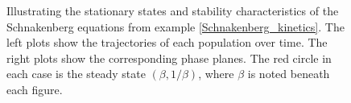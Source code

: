 \begin{figure}[p!!!h!!!tb]
\centering
{}
\caption{ \label{Schnakenberg_betas}Illustrating the stationary states and stability characteristics of the Schnakenberg equations from example \ref{Schnakenberg_kinetics}. The left plots show the trajectories of each population over time. The right plots show the corresponding phase planes. The red circle in each case is the steady state $(\beta,1/\beta)$, where $\beta$ is noted beneath each figure.}
\end{figure}


